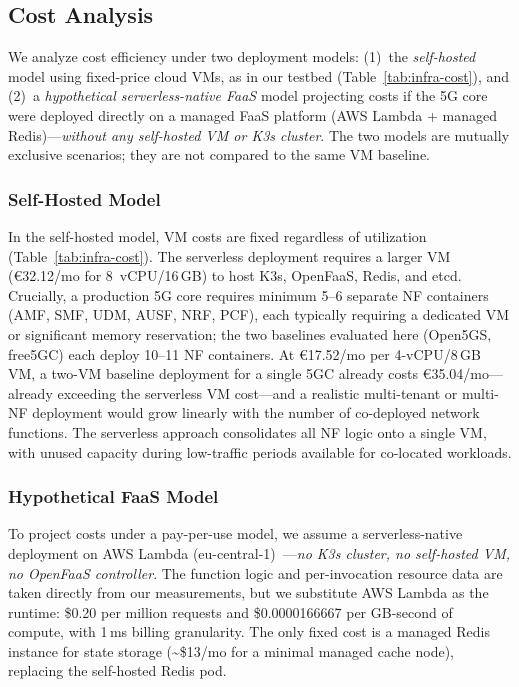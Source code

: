 \documentclass[conference]{IEEEtran}
\begin{document}
\subsection{Cost Analysis}

We analyze cost efficiency under two deployment models: (1)~the \textit{self-hosted} model using fixed-price cloud VMs, as in our testbed (Table~\ref{tab:infra-cost}), and (2)~a \textit{hypothetical serverless-native FaaS} model projecting costs if the 5G core were deployed directly on a managed FaaS platform (AWS Lambda + managed Redis)---\textit{without any self-hosted VM or K3s cluster}. The two models are mutually exclusive scenarios; they are not compared to the same VM baseline.

\subsubsection{Self-Hosted Model}

In the self-hosted model, VM costs are fixed regardless of utilization (Table~\ref{tab:infra-cost}). The serverless deployment requires a larger VM (\euro32.12/mo for 8~vCPU/16\,GB) to host K3s, OpenFaaS, Redis, and etcd. Crucially, a production 5G core requires minimum 5--6 separate NF containers (AMF, SMF, UDM, AUSF, NRF, PCF), each typically requiring a dedicated VM or significant memory reservation; the two baselines evaluated here (Open5GS, free5GC) each deploy 10--11 NF containers. At \euro17.52/mo per 4-vCPU/8\,GB VM, a two-VM baseline deployment for a single 5GC already costs \euro35.04/mo---already exceeding the serverless VM cost---and a realistic multi-tenant or multi-NF deployment would grow linearly with the number of co-deployed network functions. The serverless approach consolidates all NF logic onto a single VM, with unused capacity during low-traffic periods available for co-located workloads.

\subsubsection{Hypothetical FaaS Model}

To project costs under a pay-per-use model, we assume a serverless-native deployment on AWS Lambda (eu-central-1)~\cite{aws-lambda-pricing}---\textit{no K3s cluster, no self-hosted VM, no OpenFaaS controller}. The function logic and per-invocation resource data are taken directly from our measurements, but we substitute AWS Lambda as the runtime: \$0.20 per million requests and \$0.0000166667 per GB-second of compute, with 1\,ms billing granularity. The only fixed cost is a managed Redis instance for state storage (\textasciitilde{}\$13/mo for a minimal managed cache node), replacing the self-hosted Redis pod.
\end{document}
